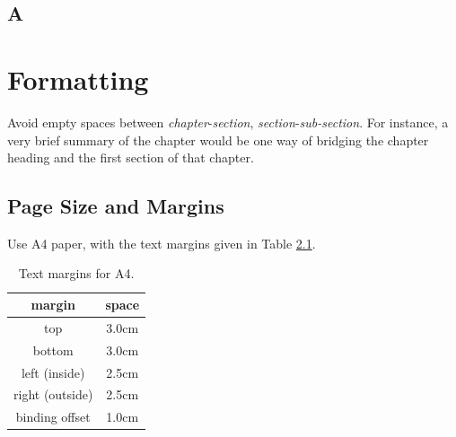 \documentclass{cslthse-msc}
\begin{document}
\begin{appendices}
\chapter{A}

\end{appendices}












\chapter[Short on Formatting]{Formatting}
Avoid empty spaces between \textit{chapter}-\textit{section}, \textit{section}-\textit{sub-section}. For instance, a very brief summary of the chapter would be one way of bridging the chapter heading and the first section of that chapter.
\section{Page Size and Margins}
Use A4 paper, with the text margins given in Table \ref{tab:margins}.
\begin{table}[!hbt]
\centering
\caption{Text margins for A4.}\label{tab:margins}
\begin{tabular}{cc}
\hline
\textbf{margin} & \textbf{space} \\
\hline 
top &  3.0cm\\ 

bottom & 3.0cm \\ 
 
left (inside) & 2.5cm \\ 

right (outside) & 2.5cm \\ 

binding offset & 1.0cm \\ 
\hline 
\end{tabular} 
\end{table}
\end{document}
